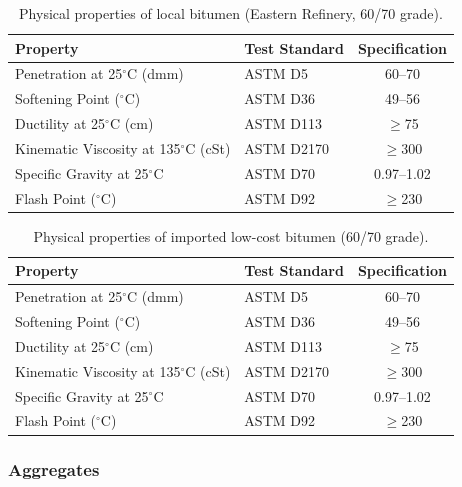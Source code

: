 \documentclass[12pt,a4paper]{article}
\begin{document}
\begin{table}[htbp]
    \centering
    \caption{Physical properties of local bitumen (Eastern Refinery, 60/70 grade).}
    \label{tab:local_bitumen}
    \begin{tabular}{@{}llc@{}}
        \toprule
        \textbf{Property} & \textbf{Test Standard} & \textbf{Specification} \\
        \midrule
        Penetration at 25$^{\circ}$C (dmm) & ASTM D5 & 60--70 \\
        Softening Point ($^{\circ}$C) & ASTM D36 & 49--56 \\
        Ductility at 25$^{\circ}$C (cm) & ASTM D113 & $\geq$75 \\
        Kinematic Viscosity at 135$^{\circ}$C (cSt) & ASTM D2170 & $\geq$300 \\
        Specific Gravity at 25$^{\circ}$C & ASTM D70 & 0.97--1.02 \\
        Flash Point ($^{\circ}$C) & ASTM D92 & $\geq$230 \\
        \bottomrule
    \end{tabular}
\end{table}

\begin{table}[htbp]
    \centering
    \caption{Physical properties of imported low-cost bitumen (60/70 grade).}
    \label{tab:imported_bitumen}
    \begin{tabular}{@{}llc@{}}
        \toprule
        \textbf{Property} & \textbf{Test Standard} & \textbf{Specification} \\
        \midrule
        Penetration at 25$^{\circ}$C (dmm) & ASTM D5 & 60--70 \\
        Softening Point ($^{\circ}$C) & ASTM D36 & 49--56 \\
        Ductility at 25$^{\circ}$C (cm) & ASTM D113 & $\geq$75 \\
        Kinematic Viscosity at 135$^{\circ}$C (cSt) & ASTM D2170 & $\geq$300 \\
        Specific Gravity at 25$^{\circ}$C & ASTM D70 & 0.97--1.02 \\
        Flash Point ($^{\circ}$C) & ASTM D92 & $\geq$230 \\
        \bottomrule
    \end{tabular}
\end{table}

\subsubsection{Aggregates}
\end{document}
